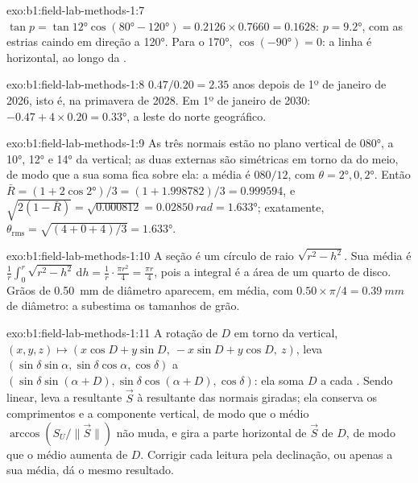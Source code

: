 \begin{solution}{exo:b1:field-lab-methods-1:7}
$\tan p = \tan\ang{12}\cos(\ang{80} - \ang{120}) = 0.2126\times0.7660 =
0.1628$: $p = \ang{9.2}$, com as estrias caindo em direção a \ang{120}. Para o
 \ang{170}, $\cos(\ang{-90}) = 0$: a linha é horizontal, ao longo da .
\end{solution}

\begin{solution}{exo:b1:field-lab-methods-1:8}
$0.47/0.20 = 2.35$ anos depois de 1º de janeiro de 2026, isto é, na primavera de 2028. Em 1º de janeiro de 2030: $-0.47 + 4\times0.20 = \ang{+0.33}$, a leste do norte geográfico.
\end{solution}

\begin{solution}{exo:b1:field-lab-methods-1:9}
As três normais estão no plano vertical de  \ang{080}, a \ang{10}, \ang{12} e \ang{14} da vertical; as duas externas são simétricas em torno da do meio, de modo que a sua soma fica sobre ela: a média é
$080/12$, com $\theta = \ang{2}, 0, \ang{2}$. Então $\bar R = (1 +
2\cos\ang{2})/3 = (1 + 1.998782)/3 = 0.999594$, e $\sqrt{2(1 - \bar R)} =
\sqrt{0.000812} = \qty{0.02850}{rad} = \ang{1.633}$; exatamente,
$\theta_{\text{rms}} = \sqrt{(4 + 0 + 4)/3} = \ang{1.633}$.
\end{solution}

\begin{solution}{exo:b1:field-lab-methods-1:10}
A seção é um círculo de raio $\sqrt{r^2 - h^2}$. Sua média é
$\frac1r\int_0^r\sqrt{r^2 - h^2}\,\mathrm dh = \frac1r\cdot\frac{\pi r^2}{4}
= \frac{\pi r}{4}$, pois a integral é a área de um quarto de disco. Grãos
de \qty{0.50}{mm} de diâmetro aparecem, em média, com $0.50\times\pi/4 = \qty{0.39}{mm}$
de diâmetro: a  subestima os tamanhos de grão.
\end{solution}

\begin{solution}{exo:b1:field-lab-methods-1:11}
A rotação de $D$ em torno da vertical,
$(x, y, z) \mapsto (x\cos D + y\sin D,\ -x\sin D + y\cos D,\ z)$, leva
$(\sin\delta\sin\alpha, \sin\delta\cos\alpha, \cos\delta)$ a
$(\sin\delta\sin(\alpha + D), \sin\delta\cos(\alpha + D), \cos\delta)$: ela
soma $D$ a cada . Sendo linear, leva a resultante
$\vec S$ à resultante das normais giradas; ela conserva os comprimentos e a componente vertical, de modo que o  médio $\arccos(S_U/\|\vec S\|)$ não muda, e gira a parte horizontal de $\vec S$ de $D$, de modo que o  médio aumenta de $D$. Corrigir cada leitura pela declinação, ou apenas a sua média, dá o mesmo resultado.
\end{solution}


